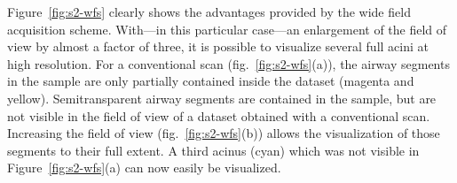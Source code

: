 Figure~\ref{fig:s2-wfs} clearly shows the advantages provided by the wide field acquisition scheme. With---in this particular case---an enlargement of the field of view by almost a factor of three, it is possible to visualize several full acini at high resolution. For a conventional scan (fig.~\ref{fig:s2-wfs}(a)), the airway segments in the sample are only partially contained inside the dataset (magenta and yellow). Semitransparent airway segments are contained in the sample, but are not visible in the field of view of a dataset obtained with a conventional scan. Increasing the field of view (fig.~\ref{fig:s2-wfs}(b)) allows the visualization of those segments to their full extent. A third acinus (cyan) which was not visible in Figure~\ref{fig:s2-wfs}(a) can now easily be visualized.

\renewcommand{\imsize}{.618\linewidth}%
